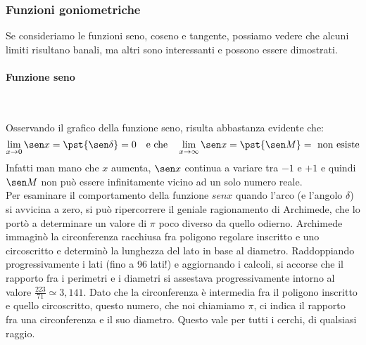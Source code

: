 \subsubsection{Funzioni goniometriche}

Se consideriamo le funzioni seno, coseno e tangente, possiamo vedere che 
alcuni limiti risultano banali, ma altri sono interessanti e possono essere 
dimostrati.

\begin{minipage}{.66\textwidth}
\begin{center} \sinusoide \end{center}
\begin{center} \cosinusoide \end{center}
\end{minipage}
\hfill
\begin{minipage}{.33\textwidth}
\begin{center} \tangentoide \end{center}
\end{minipage}

\paragraph{Funzione seno}~
\label{limiti:par_f_seno}

Osservando il grafico della funzione seno, risulta abbastanza evidente che:
\[\lim_{x \rightarrow 0}{\sen x} = \pst{\sen \delta} = 0
\quad \text{e che} \quad 
\lim_{x \rightarrow \infty}{\sen x} = \pst{\sen M} = \text{ non esiste}\]
Infatti man mano che \(x\) aumenta, \(\sen x\)
continua a variare tra \(-1\) e \(+1\) e quindi 
\(\sen M\) non può essere infinitamente vicino ad un solo numero reale.\\

Per esaminare il comportamento della funzione \(sen x\) quando l'arco (e 
l'angolo \(\delta\)) si avvicina a zero, si può ripercorrere il geniale 
ragionamento di Archimede, che lo portò a determinare un valore di \(\pi\) 
poco diverso da quello odierno. Archimede immaginò la circonferenza racchiusa 
fra poligono regolare inscritto e uno circoscritto e determinò la lunghezza del 
lato in base al diametro. Raddoppiando progressivamente i lati (fino a 96 
lati!) e aggiornando i calcoli, si accorse che il rapporto fra i perimetri e i 
diametri si assestava progressivamente intorno al valore 
\(\frac{223}{71}\simeq 3,141\). Dato che la circonferenza è intermedia fra il 
poligono inscritto e quello circoscritto, questo numero, che noi chiamiamo 
\(\pi\), ci indica il rapporto fra una circonferenza e il 
suo diametro. Questo vale per tutti i cerchi, di qualsiasi raggio.\\

